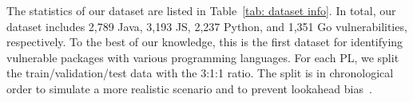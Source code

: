 

The statistics of our dataset are listed in Table~\ref{tab: dataset info}. In total, our dataset includes 2,789 Java, 3,193 JS, 2,237 Python, and 1,351 Go vulnerabilities, respectively. To the best of our knowledge, this is the first dataset for identifying vulnerable packages with various programming languages. For each PL, we split the train/validation/test data with the 3:1:1 ratio. The split is in chronological order to simulate a more realistic scenario and to prevent lookahead bias~\cite{lookahead_bias}.





